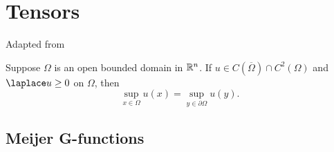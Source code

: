 
\section{Tensors}%
\label{sec:tensors_appendix}



Adapted from \cite[Thm. 2.1]{Taylor}
\begin{theorem}%
  \label{thm:ana.max_principle}
  Suppose $\Omega$ is an open bounded domain in ${\mathbb{R}}^n$.
  If $u \in C(\overline{\Omega}) \cap C^2(\Omega)$ and $\laplace u \ge 0$ on $\Omega$, then
  \[
    \sup_{x \in \Omega} u(x) = \sup_{y \in \partial\Omega} u(y).
  \]
\end{theorem}



\subsection{Meijer G-functions}%
\label{sub:tensors.meijer}

